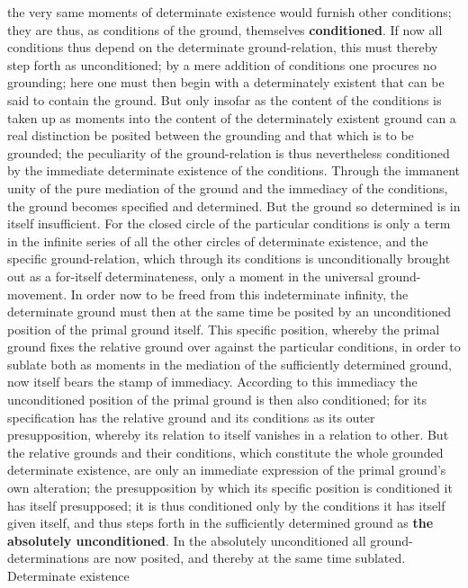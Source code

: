 \documentclass[12pt,a4paper,openany]{book}
\newcommand{\opage}[1]{\marginnote{\footnotesize\textit{[#1]}}}
\begin{document}
the very same moments of determinate existence would
furnish other conditions; they are thus, as conditions of the ground,
themselves \textbf{conditioned}. If now
all conditions thus depend on the determinate ground-relation,
this must thereby step forth as unconditioned;
by a mere addition of conditions one procures
no grounding; here one must then begin
with a determinately existent that can be said to contain
the ground. But only insofar as the content of the conditions
is taken up as moments into the content of the determinately existent
ground can a real
distinction be posited between the grounding and that which is to be grounded; the peculiarity of the ground-relation is
thus nevertheless conditioned by the immediate determinate existence
of the conditions. Through the immanent unity of the pure mediation of the ground
and the immediacy of the conditions, the ground
becomes specified and determined. But the ground
\setcounter{footnote}{0}%
\opage{138}so determined is in itself insufficient. For the
closed circle of the particular conditions is
only a term in the infinite series of all the other
circles of determinate existence, and the specific ground-relation,
which through its conditions is unconditionally brought out
as a for-itself determinateness, only a
moment in the universal ground-movement. In order
now to be freed from this indeterminate infinity,
the determinate ground must then at the same time be posited by an
unconditioned position of the primal ground itself. This
specific position, whereby the primal ground fixes the
relative ground over against the particular conditions,
in order to sublate both as moments in the mediation
of the sufficiently determined ground, now
itself bears the stamp of immediacy. According to this
immediacy the unconditioned position of the primal ground is
then also conditioned; for its specification has
the relative ground and its conditions as its
outer presupposition, whereby its relation to itself
vanishes in a relation to other. But the
relative grounds and their conditions, which constitute
the whole grounded determinate existence, are only an immediate
expression of the primal ground's own alteration;
the presupposition by which its specific position
is conditioned it has itself presupposed; it is thus conditioned
only by the conditions it has itself given itself,
and thus steps forth in the sufficiently determined
ground as \textbf{the absolutely unconditioned}. In the absolutely unconditioned all ground-determinations are now
posited, and thereby at the same time sublated. Determinate existence
\end{document}
